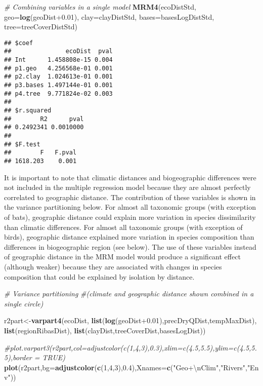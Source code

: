 \documentclass[]{article}
\newenvironment{Shaded}{\begin{snugshade}}{\end{snugshade}}
\newcommand{\CharTok}[1]{\textcolor[rgb]{0.31,0.60,0.02}{#1}}
\newcommand{\CommentTok}[1]{\textcolor[rgb]{0.56,0.35,0.01}{\textit{#1}}}
\newcommand{\DataTypeTok}[1]{\textcolor[rgb]{0.13,0.29,0.53}{#1}}
\newcommand{\DecValTok}[1]{\textcolor[rgb]{0.00,0.00,0.81}{#1}}
\newcommand{\FloatTok}[1]{\textcolor[rgb]{0.00,0.00,0.81}{#1}}
\newcommand{\KeywordTok}[1]{\textcolor[rgb]{0.13,0.29,0.53}{\textbf{#1}}}
\newcommand{\NormalTok}[1]{#1}
\newcommand{\StringTok}[1]{\textcolor[rgb]{0.31,0.60,0.02}{#1}}
\begin{document}
\begin{Shaded}
\begin{Highlighting}[]
\CommentTok{# Combining variables in a single model}
\KeywordTok{MRM4}\NormalTok{(ecoDistStd,}
     \DataTypeTok{geo=}\KeywordTok{log}\NormalTok{(geoDist}\FloatTok{+0.01}\NormalTok{),}
     \DataTypeTok{clay=}\NormalTok{clayDistStd,}
     \DataTypeTok{bases=}\NormalTok{basesLogDistStd,}
     \DataTypeTok{tree=}\NormalTok{treeCoverDistStd)}
\end{Highlighting}
\end{Shaded}

\begin{verbatim}
## $coef
##               ecoDist  pval
## Int      1.458808e-15 0.004
## p1.geo   4.256568e-01 0.001
## p2.clay  1.024613e-01 0.001
## p3.bases 1.497144e-01 0.001
## p4.tree  9.771824e-02 0.003
## 
## $r.squared
##        R2      pval 
## 0.2492341 0.0010000 
## 
## $F.test
##        F   F.pval 
## 1618.203    0.001
\end{verbatim}

It is important to note that climatic distances and biogeographic
differences were not included in the multiple regression model because
they are almost perfectly correlated to geographic distance. The
contribution of these variables is shown in the variance partitioning
below. For almost all taxonomic groups (with exception of bats),
geographic distance could explain more variation in species
dissimilarity than climatic differences. For almost all taxonomic groups
(with exception of birds), geographic distance explained more variation
in species composition than differences in biogeographic region (see
below). The use of these variables instead of geographic distance in the
MRM model would produce a significant effect (although weaker) because
they are associated with changes in species composition that could be
explained by isolation by distance.

\begin{Shaded}
\begin{Highlighting}[]
\CommentTok{# Variance partitioning}
\CommentTok{#(climate and geographic distance shown combined in a single circle)}

\NormalTok{r2part<-}\KeywordTok{varpart4}\NormalTok{(ecoDist,}
                 \KeywordTok{list}\NormalTok{(}\KeywordTok{log}\NormalTok{(geoDist}\FloatTok{+0.01}\NormalTok{),precDryQDist,tempMaxDist),}
                 \KeywordTok{list}\NormalTok{(regionRibasDist),}
                 \KeywordTok{list}\NormalTok{(clayDist,treeCoverDist,basesLogDist))}

\CommentTok{#plot.varpart3(r2part,col=adjustcolor(c(1,4,3),0.3),xlim=c(4.5,5.5),ylim=c(4.5,5.5),border = TRUE)}
\KeywordTok{plot}\NormalTok{(r2part,}\DataTypeTok{bg=}\KeywordTok{adjustcolor}\NormalTok{(}\KeywordTok{c}\NormalTok{(}\DecValTok{1}\NormalTok{,}\DecValTok{4}\NormalTok{,}\DecValTok{3}\NormalTok{),}\FloatTok{0.4}\NormalTok{),}\DataTypeTok{Xnames=}\KeywordTok{c}\NormalTok{(}\StringTok{"Geo+}\CharTok{\textbackslash{}n}\StringTok{Clim"}\NormalTok{,}\StringTok{"Rivers"}\NormalTok{,}\StringTok{"Env"}\NormalTok{))}
\end{Highlighting}
\end{Shaded}
\end{document}
